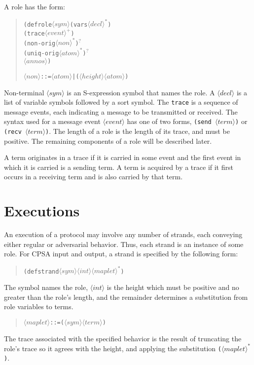 \documentclass[12pt]{article}
\newcommand{\nterm}[1]{\ensuremath{\langle\mathit{#1}\rangle}}
\newcommand{\nterms}[1]{\ensuremath{\nterm{#1}^\ast}}
\newcommand{\ntermp}[1]{\ensuremath{\nterm{#1}^+}}
\newcommand{\ntermo}[1]{#1$^?$}
\begin{document}
A role has the form:
\begin{quote}
\begin{alltt}
(defrole \nterm{sym} (vars \nterms{decl})
\quad (trace \ntermp{event})
\quad \ntermo{(non-orig \nterms{non})}
\quad \ntermo{(uniq-orig \nterms{atom})}
\quad \nterm{annos})

\nterm{non} ::= \nterm{atom} | (\nterm{height} \nterm{atom})
\end{alltt}
\end{quote}
Non-terminal \nterm{sym} is an S-expression symbol that names the
role.  A \nterm{decl} is a list of variable symbols followed by a sort
symbol.  The \texttt{trace} is a sequence of message events, each
indicating a message to be transmitted or received.  The syntax used
for a message event \nterm{event} has
one of two forms, \texttt{(send \nterm{term})} or \texttt{(recv
  \nterm{term})}.  The length of a role is the length of its trace,
and must be positive.  The remaining components of a role will be
described later.

A term originates in a trace if it is carried in some event
and the first event in which it is carried is a sending term.
A term is acquired by a trace if it first occurs in a receiving term
and is also carried by that term.

\section{Executions}

An execution of a protocol may involve any number of strands, each
conveying either regular or adversarial behavior.  Thus, each strand
is an instance of some role.  For CPSA input and output, a strand is
specified by the following form:
\begin{quote}
\begin{alltt}
(defstrand \nterm{sym} \nterm{int} \nterms{maplet})
\end{alltt}
\end{quote}
The symbol names the role, \nterm{int} is the height which must be
positive and no greater than the role's length, and the remainder
determines a substitution from role variables to terms.
\begin{quote}
\begin{alltt}
\nterm{maplet} ::= (\nterm{sym} \nterm{term})
\end{alltt}
\end{quote}
The trace associated with the specified behavior is the result of
truncating the role's trace so it agrees with the height, and applying
the substitution \texttt{(\nterms{maplet})}.
\end{document}
